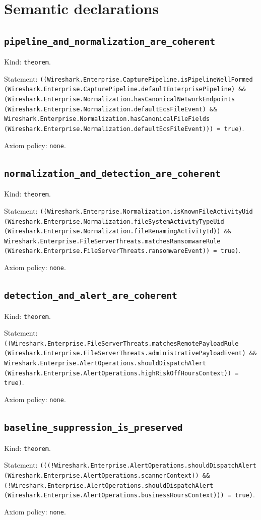 \documentclass[11pt]{article}
\begin{document}
\section*{Semantic declarations}
\subsection*{\texttt{pipeline\_and\_normalization\_are\_coherent}}
\noindent Kind: \texttt{theorem}.\par
\noindent Statement: \texttt{((Wireshark.Enterprise.CapturePipeline.isPipelineWellFormed (Wireshark.Enterprise.CapturePipeline.defaultEnterprisePipeline) \&\& (Wireshark.Enterprise.Normalization.hasCanonicalNetworkEndpoints (Wireshark.Enterprise.Normalization.defaultEcsFileEvent) \&\& Wireshark.Enterprise.Normalization.hasCanonicalFileFields (Wireshark.Enterprise.Normalization.defaultEcsFileEvent))) = true)}.\par
\noindent Axiom policy: \texttt{none}.\par
\subsection*{\texttt{normalization\_and\_detection\_are\_coherent}}
\noindent Kind: \texttt{theorem}.\par
\noindent Statement: \texttt{((Wireshark.Enterprise.Normalization.isKnownFileActivityUid (Wireshark.Enterprise.Normalization.fileSystemActivityTypeUid (Wireshark.Enterprise.Normalization.fileRenamingActivityId)) \&\& Wireshark.Enterprise.FileServerThreats.matchesRansomwareRule (Wireshark.Enterprise.FileServerThreats.ransomwareEvent)) = true)}.\par
\noindent Axiom policy: \texttt{none}.\par
\subsection*{\texttt{detection\_and\_alert\_are\_coherent}}
\noindent Kind: \texttt{theorem}.\par
\noindent Statement: \texttt{((Wireshark.Enterprise.FileServerThreats.matchesRemotePayloadRule (Wireshark.Enterprise.FileServerThreats.administrativePayloadEvent) \&\& Wireshark.Enterprise.AlertOperations.shouldDispatchAlert (Wireshark.Enterprise.AlertOperations.highRiskOffHoursContext)) = true)}.\par
\noindent Axiom policy: \texttt{none}.\par
\subsection*{\texttt{baseline\_suppression\_is\_preserved}}
\noindent Kind: \texttt{theorem}.\par
\noindent Statement: \texttt{(((!Wireshark.Enterprise.AlertOperations.shouldDispatchAlert (Wireshark.Enterprise.AlertOperations.scannerContext)) \&\& (!Wireshark.Enterprise.AlertOperations.shouldDispatchAlert (Wireshark.Enterprise.AlertOperations.businessHoursContext))) = true)}.\par
\noindent Axiom policy: \texttt{none}.\par
\end{document}
